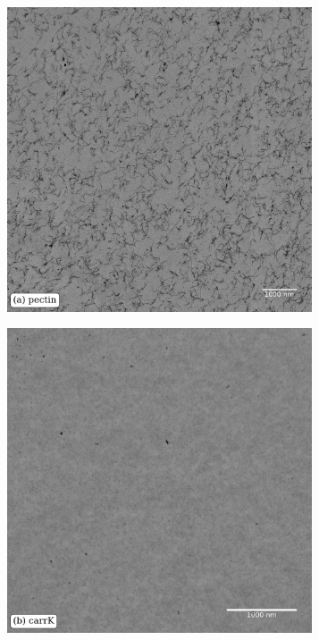 \begin{figure}[!h]
  \begin{subfigure}{0.32\textwidth}
    \includegraphics[width=0.99\textwidth]{Figures/chapter-temsaxs/pectin1_1045_homogeneous_scalebar_label.jpeg}
  \end{subfigure}
  \begin{subfigure}{0.32\textwidth}
    \includegraphics[width=0.99\textwidth]{Figures/chapter-temsaxs/carrageenan_K_Montage_833_scalebarFixed_label.jpeg}

\end{subfigure}
\end{figure}
